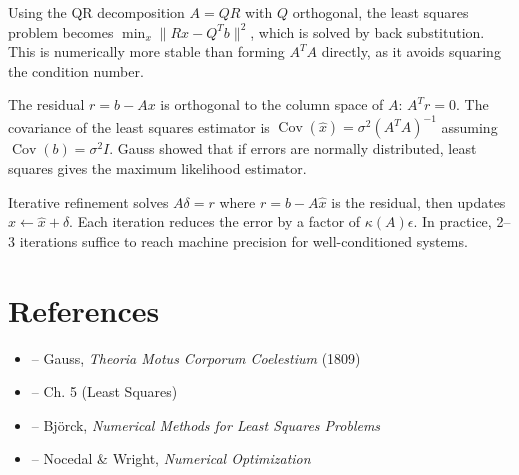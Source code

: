 \begin{solution}
Using the QR decomposition $A = QR$ with $Q$ orthogonal, the least squares problem becomes $\min_x \|Rx - Q^Tb\|^2$, which is solved by back substitution. This is numerically more stable than forming $A^TA$ directly, as it avoids squaring the condition number.
\end{solution}

\begin{solution}
The residual $r = b - Ax$ is orthogonal to the column space of $A$: $A^Tr = 0$. The covariance of the least squares estimator is $\operatorname{Cov}(\hat{x}) = \sigma^2(A^TA)^{-1}$ assuming $\operatorname{Cov}(b) = \sigma^2 I$. Gauss showed that if errors are normally distributed, least squares gives the maximum likelihood estimator.
\end{solution}

\begin{solution}
Iterative refinement solves $A\delta = r$ where $r = b - A\hat{x}$ is the residual, then updates $\hat{x} \leftarrow \hat{x} + \delta$. Each iteration reduces the error by a factor of $\kappa(A)\epsilon$. In practice, 2--3 iterations suffice to reach machine precision for well-conditioned systems.
\end{solution}


\section{References}

\begin{itemize}
    \item \cite{gauss-theoria} -- Gauss, \textit{Theoria Motus Corporum Coelestium} (1809)
    \item \cite{golub-vanloan} -- Ch. 5 (Least Squares)
    \item \cite{bjorck} -- Björck, \textit{Numerical Methods for Least Squares Problems}
    \item \cite{nocedal-wright} -- Nocedal \& Wright, \textit{Numerical Optimization}
\end{itemize}